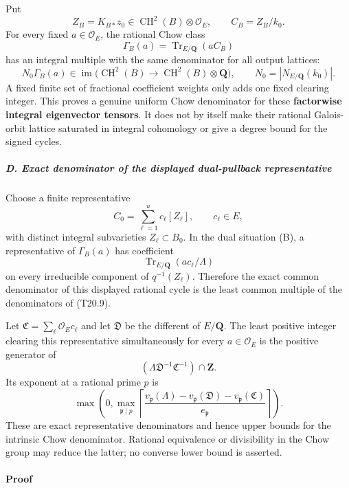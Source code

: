 \documentclass[11pt,a4paper]{article}
\theoremstyle{definition}
\begin{document}
Put \[
 Z_B=K_{B*}z_0\in\operatorname{CH}^2(B)\otimes\mathcal O_E,
 \qquad C_B=Z_B/k_0.
\] For every fixed \(a\in\mathcal O_E\), the rational Chow class \[
 \Gamma_B(a)=\operatorname{Tr}_{E/\mathbf Q}(a C_B)
\] has an integral multiple with the same denominator for all output lattices: \[
 N_0\Gamma_B(a)\in\operatorname{im}
 \bigl(\operatorname{CH}^2(B)\longrightarrow
                 \operatorname{CH}^2(B)\otimes\mathbf Q\bigr),
 \qquad
 N_0=|N_{E/\mathbf Q}(k_0)|.
 \tag{T20.7}
\] A fixed finite set of fractional coefficient weights only adds one fixed clearing integer. This proves a genuine uniform Chow denominator for these \textbf{factorwise integral eigenvector tensors}. It does not by itself make their rational Galois-orbit lattice saturated in integral cohomology or give a degree bound for the signed cycles.

\subparagraph{D. Exact denominator of the displayed dual-pullback representative}\label{d.-exact-denominator-of-the-displayed-dual-pullback-representative}

Choose a finite representative \[
 C_0=\sum_{\ell=1}^u c_\ell[Z_\ell],\qquad c_\ell\in E,
 \tag{T20.8}
\] with distinct integral subvarieties \(Z_\ell\subset B_0\). In the dual situation (B), a representative of \(\Gamma_B(a)\) has coefficient \[
 \operatorname{Tr}_{E/\mathbf Q}(a c_\ell/\Lambda)
 \tag{T20.9}
\] on every irreducible component of \(q^{-1}(Z_\ell)\). Therefore the exact common denominator of this displayed rational cycle is the least common multiple of the denominators of (T20.9).

Let \(\mathfrak C=\sum_\ell\mathcal O_Ec_\ell\) and let \(\mathfrak D\) be the different of \(E/\mathbf Q\). The least positive integer clearing this representative simultaneously for every \(a\in\mathcal O_E\) is the positive generator of \[
 (\Lambda\mathfrak D^{-1}\mathfrak C^{-1})\cap\mathbf Z.
 \tag{T20.10}
\] Its exponent at a rational prime \(p\) is \[
 \max\left(0,\max_{\mathfrak p\mid p}
 \left\lceil\frac{v_{\mathfrak p}(\Lambda)
                      -v_{\mathfrak p}(\mathfrak D)
                      -v_{\mathfrak p}(\mathfrak C)}{e_{\mathfrak p}}\right\rceil\right).
 \tag{T20.11}
\] These are exact representative denominators and hence upper bounds for the intrinsic Chow denominator. Rational equivalence or divisibility in the Chow group may reduce the latter; no converse lower bound is asserted.

\paragraph{Proof}\label{proof-1}
\end{document}
